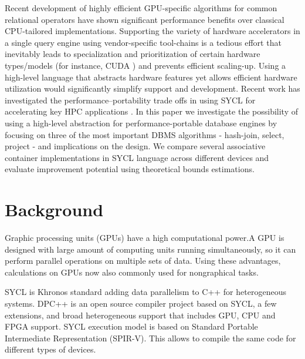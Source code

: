 \documentclass[sigconf, nonacm]{acmart}
\begin{document}
Recent development of highly efficient GPU-specific algorithms for common relational operators have shown significant performance benefits over classical CPU-tailored implementations. Supporting the variety of hardware accelerators in a single query engine using vendor-specific tool-chains is a tedious effort that inevitably leads to specialization and prioritization of certain hardware types/models (for instance, CUDA \cite{cuda})
and prevents efficient scaling-up. Using a high-level language
that abstracts hardware features yet allows efficient hardware
utilization would significantly simplify support and development.
Recent work has investigated the performance–portability trade
offs in using SYCL for accelerating key HPC applications \cite{deakin}. In this paper we investigate the possibility of using a high-level abstraction for performance-portable database engines by focusing on three of the most important DBMS algorithms - hash-join, select, project - and implications on the design. We compare several associative container implementations in SYCL language across different devices and evaluate improvement potential using theoretical bounds estimations.


\section{Background}
Graphic processing units (GPUs) have a high computational
power.A GPU is designed with large amount of computing units running simultaneously, so it can perform parallel
operations on multiple sets of data. Using these advantages,
calculations on GPUs now also commonly used for nongraphical tasks.

SYCL \cite{dpcpp_book} is Khronos standard adding data parallelism to C++ for heterogeneous systems. DPC++ is an open source compiler project based on SYCL, a few extensions,
and broad heterogeneous support that includes GPU, CPU
and FPGA support. SYCL execution model is based on
Standard Portable Intermediate Representation (SPIR-V).
This allows to compile the same code for different types of
devices.
\end{document}
